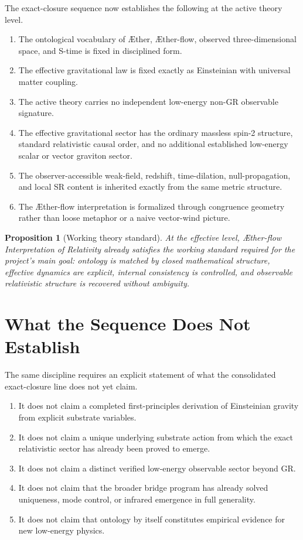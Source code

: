 \documentclass[11pt]{article}
\newcommand{\Aether}{\AE{}ther}
\newcommand{\Aflow}{\AE{}ther-flow}
\newcommand{\TheoryName}{\Aflow{} Interpretation of Relativity}
\newtheorem{proposition}{Proposition}
\begin{document}
The exact-closure sequence now establishes the following at the active theory level.
\begin{enumerate}
    \item The ontological vocabulary of \Aether{}, \Aflow{}, observed three-dimensional space, and S-time is fixed in disciplined form.
    \item The effective gravitational law is fixed exactly as Einsteinian with universal matter coupling.
    \item The active theory carries no independent low-energy non-GR observable signature.
    \item The effective gravitational sector has the ordinary massless spin-2 structure, standard relativistic causal order, and no additional established low-energy scalar or vector graviton sector.
    \item The observer-accessible weak-field, redshift, time-dilation, null-propagation, and local SR content is inherited exactly from the same metric structure.
    \item The \Aflow{} interpretation is formalized through congruence geometry rather than loose metaphor or a naive vector-wind picture.
\end{enumerate}

\begin{proposition}[Working theory standard]
At the effective level, \TheoryName{} already satisfies the working standard required for the project's main goal: ontology is matched by closed mathematical structure, effective dynamics are explicit, internal consistency is controlled, and observable relativistic structure is recovered without ambiguity.
\end{proposition}

\section{What the Sequence Does Not Establish}

The same discipline requires an explicit statement of what the consolidated exact-closure line does not yet claim.
\begin{enumerate}
    \item It does not claim a completed first-principles derivation of Einsteinian gravity from explicit substrate variables.
    \item It does not claim a unique underlying substrate action from which the exact relativistic sector has already been proved to emerge.
    \item It does not claim a distinct verified low-energy observable sector beyond GR.
    \item It does not claim that the broader bridge program has already solved uniqueness, mode control, or infrared emergence in full generality.
    \item It does not claim that ontology by itself constitutes empirical evidence for new low-energy physics.
\end{enumerate}
\end{document}
